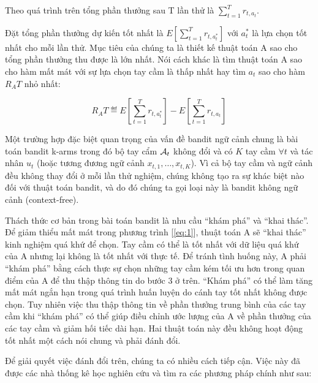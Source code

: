 \documentclass[14pt,oneside]{scrbook}
\begin{document}
Theo quá trình trên tổng phần thưởng sau T lần thử là
\(\sum_{t=1}^{T}{r_{t,a_t}}\).

Đặt tổng phần thưởng dự kiến tốt nhất là
\(E\left[\sum_{t=1}^{T}{r_{t,a^{*}_{t}}}\right]\) với \(a^{*}_{t}\) là
lựa chọn tốt nhất cho mỗi lần thử. Mục tiêu của chúng ta là thiết kế
thuật toán A sao cho tổng phần thưởng thu được là lớn nhất. Nói cách
khác là tìm thuật toán A sao cho hàm mất mát với sự lựa chọn tay cầm là
thấp nhất hay tìm \(a_t\) sao cho hàm \(R_A{T}\) nhỏ nhất:

\begin{equation}R_A{T} \eqdef E\left[\sum_{t=1}^{T}{r_{t,a^{*}_{t}}}\right] - E\left[\sum_{t=1}^{T}{r_{t,a_{t}}}\right]\label{eq:1}\end{equation}

Một trường hợp đặc biệt quan trọng của vấn đề bandit ngữ cảnh chung là
bài toán bandit k-arms trong đó bộ tay cẩm \(\mathcal{A}_t\) không đổi và có
\(K\) tay cầm \(\forall t\) và tác nhân \(u_t\) (hoặc tương đương ngữ
cảnh \(x_{t,1},\ldots,x_{t,K}\)). Vì cả bộ tay cầm và ngữ cảnh đều không
thay đổi ở mỗi lần thử nghiệm, chúng không tạo ra sự khác biệt nào đối
với thuật toán bandit, và do đó chúng ta gọi loại này là bandit không
ngữ cảnh (context-free).

Thách thức cơ bản trong bài toán bandit là nhu cầu ``khám phá'' và
``khai thác''. Để giảm thiểu mất mát trong phương trình
{[}\ref{eq:1}{]}, thuật toán A sẽ ``khai thác'' kinh nghiệm quá khứ để
chọn. Tay cầm có thể là tốt nhất với dữ liệu quá khứ của A nhưng lại
không là tốt nhất với thực tế. Để tránh tình huống này, A phải ``khám
phá'' bằng cách thực sự chọn những tay cầm kém tối ưu hơn trong quan
điểm của A để thu thập thông tin do bước 3 ở trên. ``Khám phá'' có thể
làm tăng mất mát ngắn hạn trong quá trình huấn luyện do cánh tay tốt
nhất không được chọn. Tuy nhiên việc thu thập thông tin về phần thưởng
trung bình của các tay cầm khi ``khám phá'' có thể giúp điều chỉnh ước
lượng của A về phần thưởng của các tay cầm và giảm hối tiếc dài hạn. Hai
thuật toán này đều không hoạt động tốt nhất một cách nói chung và phải
đánh đổi.

Để giải quyết việc đánh đổi trên, chúng ta có nhiều cách tiếp cận. Việc
này đã được các nhà thống kê học nghiên cứu và tìm ra các phương pháp
chính như sau:
\end{document}
